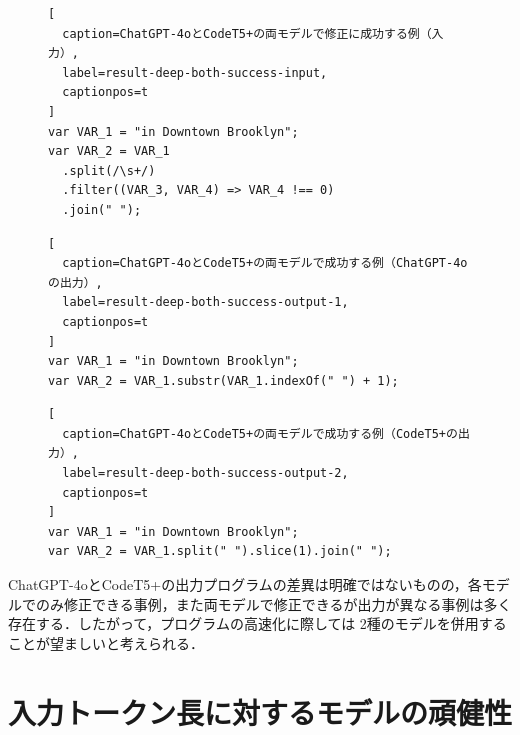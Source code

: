 \documentclass[11pt]{jreport}
\newcommand{\fixtwo}[1]{#1}
\begin{document}
\begin{figure}[t]
\captionsetup{name=Listing}
\hspace{0.04\columnwidth}
\begin{minipage}[b]{0.96\linewidth}
\begin{lstlisting}[
  caption=ChatGPT-4oとCodeT5+の両モデルで修正に成功する例（入力）,
  label=result-deep-both-success-input,
  captionpos=t
]
var VAR_1 = "in Downtown Brooklyn";
var VAR_2 = VAR_1
  .split(/\s+/)
  .filter((VAR_3, VAR_4) => VAR_4 !== 0)
  .join(" ");
\end{lstlisting}
\end{minipage}

\hspace{0.04\columnwidth}
\begin{minipage}[b]{0.96\linewidth}
\begin{lstlisting}[
  caption=ChatGPT-4oとCodeT5+の両モデルで成功する例（ChatGPT-4oの出力）,
  label=result-deep-both-success-output-1,
  captionpos=t
]
var VAR_1 = "in Downtown Brooklyn";
var VAR_2 = VAR_1.substr(VAR_1.indexOf(" ") + 1);
\end{lstlisting}
\end{minipage}

\hspace{0.04\columnwidth}
\begin{minipage}[b]{0.96\linewidth}
\begin{lstlisting}[
  caption=ChatGPT-4oとCodeT5+の両モデルで成功する例（CodeT5+の出力）,
  label=result-deep-both-success-output-2,
  captionpos=t
]
var VAR_1 = "in Downtown Brooklyn";
var VAR_2 = VAR_1.split(" ").slice(1).join(" ");
\end{lstlisting}
\end{minipage}
\end{figure}

\fixtwo{ChatGPT-4oとCodeT5+の出力プログラムの差異は明確ではないものの，各モデルでのみ修正できる事例，また両モデルで修正できるが出力が異なる事例は多く存在する．したがって，プログラムの高速化に際しては}
2種のモデルを併用することが望ましいと考えられる．




\section{入力トークン長に対するモデルの頑健性}
\end{document}

